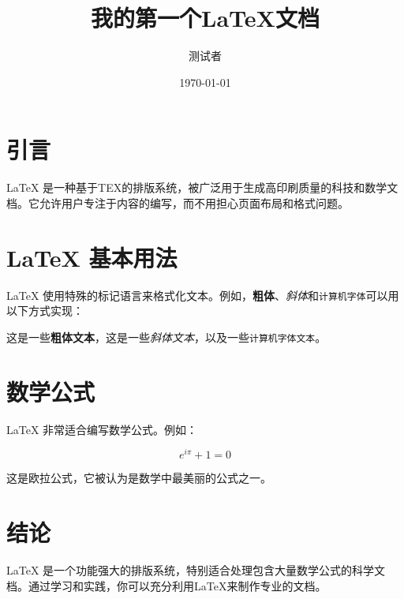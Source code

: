 \documentclass{article} %
\title{我的第一个LaTeX文档} %
\author{测试者} %
\date{\today} %
\begin{document}
\maketitle %

\section{引言}
LaTeX 是一种基于ΤΕΧ的排版系统，被广泛用于生成高印刷质量的科技和数学文档。它允许用户专注于内容的编写，而不用担心页面布局和格式问题。

\section{LaTeX 基本用法}
LaTeX 使用特殊的标记语言来格式化文本。例如，\textbf{粗体}、\textit{斜体}和\texttt{计算机字体}可以用以下方式实现：

这是一些\textbf{粗体文本}，这是一些\textit{斜体文本}，以及一些\texttt{计算机字体文本}。

\section{数学公式}
LaTeX 非常适合编写数学公式。例如：

\[ e^{i\pi} + 1 = 0 \]

这是欧拉公式，它被认为是数学中最美丽的公式之一。

\section{结论}
LaTeX 是一个功能强大的排版系统，特别适合处理包含大量数学公式的科学文档。通过学习和实践，你可以充分利用LaTeX来制作专业的文档。
\end{document}
